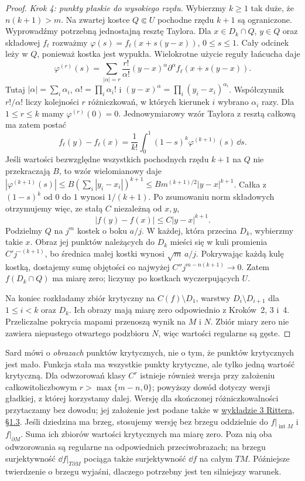 \begin{proof}
\emph{Krok 4: punkty płaskie do wysokiego rzędu.}
Wybierzmy $k\geq1$ tak duże, że
$n(k+1)>m$. Na zwartej kostce $Q\Subset U$
pochodne rzędu $k+1$ są ograniczone.
Wyprowadźmy potrzebną jednostajną resztę Taylora.
Dla $x\in D_k\cap Q$, $y\in Q$ oraz składowej $f_\ell$
rozważmy $\varphi(s)=f_\ell(x+s(y-x))$, $0\leq s\leq1$.
Cały odcinek leży w $Q$, ponieważ kostka jest wypukła.
Wielokrotne użycie reguły łańcucha daje
\[
 \varphi^{(r)}(s)
 =\sum_{|\alpha|=r}\frac{r!}{\alpha!}
       (y-x)^\alpha
       \partial^\alpha f_\ell(x+s(y-x)).
\]
Tutaj $|\alpha|=\sum_i\alpha_i$, $\alpha!=\prod_i\alpha_i!$
i $(y-x)^\alpha=\prod_i(y_i-x_i)^{\alpha_i}$.
Współczynnik $r!/\alpha!$ liczy kolejności $r$ różniczkowań,
w których kierunek $i$ wybrano $\alpha_i$ razy.
Dla $1\leq r\leq k$ mamy $\varphi^{(r)}(0)=0$.
Jednowymiarowy wzór Taylora z resztą całkową ma zatem postać
\[
 f_\ell(y)-f_\ell(x)
 =\frac1{k!}\int_0^1(1-s)^k
                  \varphi^{(k+1)}(s)\,\dd s.
\]
Jeśli wartości bezwzględne wszystkich pochodnych rzędu $k+1$
na $Q$ nie przekraczają $B$, to wzór wielomianowy daje
$|\varphi^{(k+1)}(s)|
\leq B(\sum_i|y_i-x_i|)^{k+1}
\leq Bm^{(k+1)/2}|y-x|^{k+1}$.
Całka z $(1-s)^k$ od $0$ do $1$ wynosi $1/(k+1)$.
Po zsumowaniu norm składowych otrzymujemy więc,
ze stałą $C$ niezależną od $x,y$,
\[
 |f(y)-f(x)|\leq C|y-x|^{k+1}.
\]
Podzielmy $Q$ na $j^m$ kostek o boku $a/j$.
W każdej, która przecina $D_k$, wybierzmy
takie $x$. Obraz jej punktów należących
do $D_k$ mieści się w kuli promienia
$C'j^{-(k+1)}$, bo średnica małej kostki wynosi
$\sqrt m\,a/j$. Pokrywając każdą kulę
kostką, dostajemy sumę objętości
co najwyżej $C''j^{m-n(k+1)}\to0$.
Zatem $f(D_k\cap Q)$ ma miarę zero;
liczymy po kostkach wyczerpujących $U$.

Na koniec rozkładamy zbiór krytyczny na
$C(f)\setminus D_1$, warstwy
$D_i\setminus D_{i+1}$ dla $1\leq i<k$
oraz $D_k$. Ich obrazy mają miarę zero
odpowiednio z Kroków~2, 3 i~4.
Przeliczalne pokrycia mapami przenoszą
wynik na $M$ i $N$. Zbiór miary zero
nie zawiera niepustego otwartego podzbioru
$N$, więc wartości regularne są gęste.
\end{proof}

\begin{uwaga}
Sard mówi o \emph{obrazach} punktów krytycznych,
nie o tym, że punktów krytycznych jest mało.
Funkcja stała ma wszystkie punkty krytyczne,
ale tylko jedną wartość krytyczną.
Dla odwzorowań klasy $C^r$ istnieje również
wersja przy założeniu całkowitoliczbowym
$r>\max\{m-n,0\}$; powyższy dowód dotyczy
wersji gładkiej, z której korzystamy dalej.
Wersję dla skończonej różniczkowalności przytaczamy bez dowodu;
jej założenie jest podane także w
\href{https://people.maths.ox.ac.uk/ritter/morse-cambridge/lecture03.pdf}
{wykładzie 3 Rittera, §1.3}.
Jeśli dziedzina ma brzeg, stosujemy wersję bez brzegu
oddzielnie do $f|_{\operatorname{int}M}$ i
$f|_{\partial M}$. Suma ich zbiorów wartości krytycznych
ma miarę zero. Poza nią oba odwzorowania są regularne na
odpowiednich przeciwobrazach; na brzegu surjektywność
$\dd f|_{T\partial M}$ pociąga także surjektywność
$\dd f$ na całym $TM$. Późniejsze twierdzenie o brzegu
wyjaśni, dlaczego potrzebny jest ten silniejszy warunek.
\end{uwaga}

